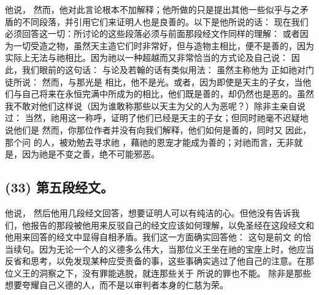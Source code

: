 他说，  然而，他对此言论根本不加解释；他所做的只是提出其他一些似乎与之矛盾的不同段落，并引用它们来证明人也是良善的。以下是他所说的话： 现在我们必须回答这一切：所讨论的这些段落必须与前面那段经文作同样的理解： 或者因为一切受造之物，虽然天主造它们时非常好，但与造物主相比，便不是善的，因为实际上无法与祂相比。因为祂以一种超越而又非常恰当的方式论及自己说：  因此，我们眼前的这句话： 与论及若翰的话有类似用法：  虽然主称他为 正如祂对门徒所说：  然而，与那光是  相比，他不是光。或者，因为即使是天主的子女，当他们与自己将来在永恒完满中所成为的相比，他们既是善的，却仍然也是恶的。虽然我不敢对他们这样说（因为谁敢称那些以天主为父的人为恶呢？）除非主亲自说过：  当然，祂用这一称呼，证明了他们已经是天主的子女；但同时祂毫不迟疑地说他们是 然而，你那位作者并没有向我们解释，他们如何是善的，同时又 因此，那个问 的人，被劝勉去寻求祂 ，藉祂的恩宠才能成为善的；对祂而言，无非就是，因为祂是不变之善，绝不可能邪恶。\par


\subsection{(33) 第五段经文。}

他说，  然后他用几段经文回答，想要证明人可以有纯洁的心。但他没有告诉我们，他报告的那段被他用来反驳自己的经文应该如何理解，以免圣经在这段经文和他用来回答的经文中显得自相矛盾。我们这一方面确实回答他： 这句是前文  的恰当续句。因为无论一个人的义德多么伟大，当那位义王坐在祂的宝座上时，他应当反省和思考，以免发现某种应受责备的事，这些事确实逃过了他自己的注意。在那位义王的洞察之下，没有罪能逃脱，就连那些关于 所说的罪也不能。  除非是那些想要夸耀自己义德的人，而不是以审判者本身的仁慈为荣。\par

